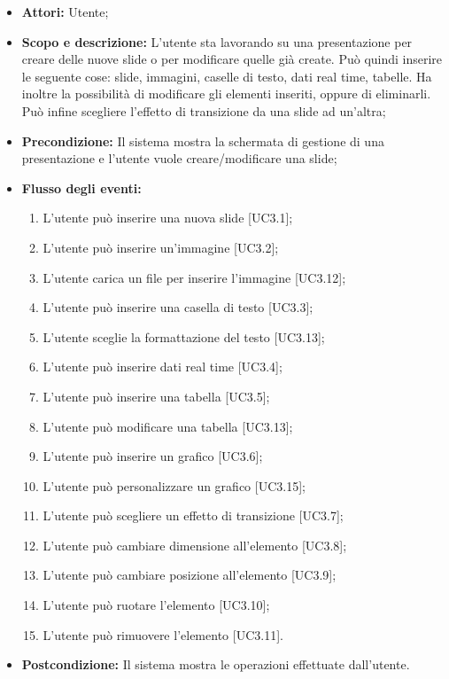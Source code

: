 \begin{itemize}
	\item \textbf{Attori:} Utente;
	\item \textbf{Scopo e descrizione:} L'utente sta lavorando su una presentazione per creare delle nuove slide o per modificare quelle già create. Può quindi inserire le seguente cose: slide, immagini, caselle di testo, dati real time, tabelle. Ha inoltre la possibilità di modificare gli elementi inseriti, oppure di eliminarli. Può infine scegliere l'effetto di transizione da una slide ad un'altra;
	\item \textbf{Precondizione:} Il sistema mostra la schermata di gestione di una presentazione e l'utente vuole creare/modificare una slide;
	\item \textbf{Flusso degli eventi:}
	\begin{enumerate}
		\item L'utente può inserire una nuova slide [UC3.1];
		
		\item L'utente può inserire un'immagine [UC3.2];
		\item L'utente carica un file per inserire l'immagine [UC3.12];
		
		\item L'utente può inserire una casella di testo [UC3.3];
		\item L'utente sceglie la formattazione del testo [UC3.13];
		
		\item L'utente può inserire dati real time [UC3.4];
		
		\item L'utente può inserire una tabella [UC3.5];
		\item L'utente può modificare una tabella [UC3.13];
		
		\item L'utente può inserire un grafico [UC3.6];
		\item L'utente può personalizzare un grafico [UC3.15];
		
		\item L'utente può scegliere un effetto di transizione [UC3.7];
		
		\item L'utente può cambiare dimensione all'elemento [UC3.8];
		
		\item L'utente può cambiare posizione all'elemento [UC3.9];
		
		\item L'utente può ruotare l'elemento [UC3.10];
		
		\item L'utente può rimuovere l'elemento [UC3.11].
	\end{enumerate}
	\item \textbf{Postcondizione:} Il sistema mostra le operazioni effettuate dall'utente.
\end{itemize}

